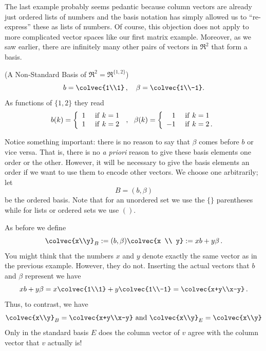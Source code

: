 The last example probably seems pedantic because column vectors are already just ordered lists of numbers and the basis notation 
has simply allowed us to ``re-express'' these as lists of numbers. Of course, this objection does not apply to more complicated vector spaces like our first matrix example. Moreover, as we saw \hypertarget{nonstandard r2 basis}{earlier}, there are infinitely many other pairs of vectors in $\Re^2$ that form a basis.

\begin{example}(A Non-Standard Basis of $\Re^2=\Re^{\{1,2\}}$)\\
\[
b=\colvec{1\\1}\, ,\quad \beta=\colvec{1\\-1}.
\]
As functions of $\{1,2\}$ they read
\begin{displaymath}
   b (k)= \left\{
     \begin{array}{lr}
       1 & {\rm ~if~} k=1\\
       1 & {\rm ~if~} k=2
     \end{array}
   \right. \, ,~~
   \beta (k)= \left\{
     \begin{array}{rl}
       1 & {\rm ~if~} k=1\\
       -1 & {\rm ~if~} k=2\, .
     \end{array}
   \right.
\end{displaymath} 

Notice something important: there is no reason to say that $\beta$ comes before $b$ or vice versa. That is, there is no {\itshape a priori} reason to give these basis elements one order or the other. 
However, it will be necessary to give the basis elements an order if we want to use them to encode other vectors.  We choose one arbitrarily; let \[B=(b,\beta)\] be the ordered basis. Note that for an unordered set we use the $\{\}$ parentheses while for lists or ordered sets we use $()$. 

As before we define 
\[
\colvec{x\\y}_B :=(b,\beta)\colvec{x \\ y}:= xb+ y \beta\, . 
\]
You might think that the numbers $x$ and $y$ denote exactly the same vector as in the previous example. However, they do not. Inserting
the actual vectors that $b$ and $\beta$ represent we have
\[
xb+ y \beta=x\colvec{1\\1}+y\colvec{1\\-1}=\colvec{x+y\\x-y}\, .
\]
Thus, to contrast, we have
\[
\colvec{x\\y}_B=\colvec{x+y\\x-y} \mbox{ and } \colvec{x\\y}_E=\colvec{x\\y}
\]
Only in the standard basis $E$ does the column vector of $v$ agree with the column vector that $v$ actually is!


\end{example}
